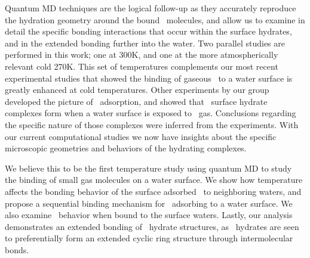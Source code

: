 
Quantum MD techniques are the logical follow-up as they accurately reproduce the hydration geometry around the bound \suldiox~molecules, and allow us to examine in detail the specific bonding interactions that occur within the surface hydrates, and in the extended bonding further into the water. Two parallel studies are performed in this work; one at 300K, and one at the more atmospherically relevant cold 270K. This set of temperatures complements our most recent experimental studies that showed the binding of gaseous \suldiox~to a water surface is greatly enhanced at cold temperatures.\cite{Ota2011} Other experiments by our group developed the picture of \suldiox~adsorption, and showed that \suldiox~surface hydrate complexes form when a water surface is exposed to \suldiox~gas.\cite{Tarbuck2005,Tarbuck2006} Conclusions regarding the specific nature of those complexes were inferred from the experiments. With our current computational studies we now have insights about the specific microscopic geometries and behaviors of the hydrating complexes.

We believe this to be the first temperature study using quantum MD to study the binding of small gas molecules on a water surface. We show how temperature affects the bonding behavior of the surface adsorbed \suldiox~to neighboring waters, and propose a sequential binding mechanism for \suldiox~adsorbing to a water surface. We also examine \suldiox~behavior when bound to the surface waters. Lastly, our analysis demonstrates an extended bonding of \suldiox~hydrate structures, as \suldiox~hydrates are seen to preferentially form an extended cyclic ring structure through intermolecular bonds.
